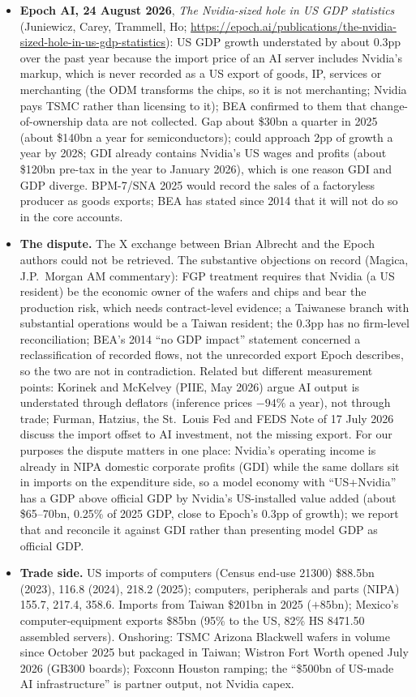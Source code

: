 \documentclass[11pt]{article}
\begin{document}
\begin{itemize}
  \item \textbf{Epoch AI, 24 August 2026}, \emph{The Nvidia-sized hole in US GDP statistics} (Juniewicz, Carey, Trammell, Ho; \url{https://epoch.ai/publications/the-nvidia-sized-hole-in-us-gdp-statistics}): US GDP growth understated by about 0.3pp over the past year because the import price of an AI server includes Nvidia's markup, which is never recorded as a US export of goods, IP, services or merchanting (the ODM transforms the chips, so it is not merchanting; Nvidia pays TSMC rather than licensing to it); BEA confirmed to them that change-of-ownership data are not collected. Gap about \$30bn a quarter in 2025 (about \$140bn a year for semiconductors); could approach 2pp of growth a year by 2028; GDI already contains Nvidia's US wages and profits (about \$120bn pre-tax in the year to January 2026), which is one reason GDI and GDP diverge. BPM-7/SNA 2025 would record the sales of a factoryless producer as goods exports; BEA has stated since 2014 that it will not do so in the core accounts.
  \item \textbf{The dispute.} The X exchange between Brian Albrecht and the Epoch authors could not be retrieved. The substantive objections on record (Magica, J.P.\ Morgan AM commentary): FGP treatment requires that Nvidia (a US resident) be the economic owner of the wafers and chips and bear the production risk, which needs contract-level evidence; a Taiwanese branch with substantial operations would be a Taiwan resident; the 0.3pp has no firm-level reconciliation; BEA's 2014 ``no GDP impact'' statement concerned a reclassification of recorded flows, not the unrecorded export Epoch describes, so the two are not in contradiction. Related but different measurement points: Korinek and McKelvey (PIIE, May 2026) argue AI output is understated through deflators (inference prices $-94\%$ a year), not through trade; Furman, Hatzius, the St.\ Louis Fed and FEDS Note of 17 July 2026 discuss the import offset to AI investment, not the missing export. For our purposes the dispute matters in one place: Nvidia's operating income is already in NIPA domestic corporate profits (GDI) while the same dollars sit in imports on the expenditure side, so a model economy with ``US+Nvidia'' has a GDP above official GDP by Nvidia's US-installed value added (about \$65--70bn, 0.25\% of 2025 GDP, close to Epoch's 0.3pp of growth); we report that and reconcile it against GDI rather than presenting model GDP as official GDP.
  \item \textbf{Trade side.} US imports of computers (Census end-use 21300) \$88.5bn (2023), 116.8 (2024), 218.2 (2025); computers, peripherals and parts (NIPA) 155.7, 217.4, 358.6. Imports from Taiwan \$201bn in 2025 ($+85$bn); Mexico's computer-equipment exports \$85bn (95\% to the US, 82\% HS 8471.50 assembled servers). Onshoring: TSMC Arizona Blackwell wafers in volume since October 2025 but packaged in Taiwan; Wistron Fort Worth opened July 2026 (GB300 boards); Foxconn Houston ramping; the ``\$500bn of US-made AI infrastructure'' is partner output, not Nvidia capex.

\end{itemize}
\end{document}
